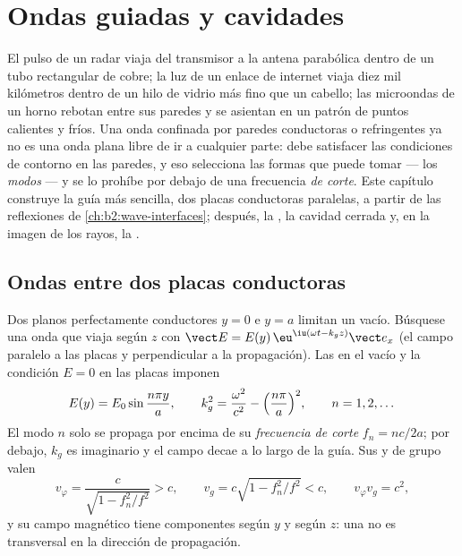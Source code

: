 \chapter{Ondas guiadas y cavidades}\label{ch:b2:guided-waves}

El pulso de un radar viaja del transmisor a la antena parabólica dentro de
un tubo rectangular de cobre; la luz de un enlace de internet viaja diez
mil kilómetros dentro de un hilo de vidrio más fino que un cabello; las
microondas de un horno rebotan entre sus paredes y se asientan en un
patrón de puntos calientes y fríos. Una onda confinada por paredes
conductoras o refringentes ya no es una onda plana libre de ir a cualquier
parte: debe satisfacer las condiciones de contorno en las paredes, y eso
selecciona las formas que puede tomar --- los \emph{modos} --- y se lo
prohíbe por debajo de una frecuencia \emph{de corte}. Este capítulo
construye la guía más sencilla, dos placas conductoras paralelas, a partir
de las reflexiones de \cref{ch:b2:wave-interfaces}; después, la , la cavidad cerrada y, en la imagen de los rayos, la .

\section{Ondas entre dos placas conductoras}

\begin{proposition}\label{prop:b2:guided-waves:plates}
Dos planos perfectamente conductores $y = 0$ e $y = a$ limitan un vacío.
Búsquese una onda que viaja según $z$ con $\vect E = E(y)\,\eu^{\iu(\omega t - k_gz)}
\vect e_x$ (el campo paralelo a las placas y perpendicular a la
propagación). Las  en el vacío y la condición $E = 0$
en las placas imponen
\[
E(y) = E_0\sin\frac{n\pi y}a , \qquad
k_g^2 = \frac{\omega^2}{c^2} - \Bigl(\frac{n\pi}a\Bigr)^2 , \qquad n = 1, 2, \dots
\]
El modo $n$ solo se propaga por encima de su \emph{frecuencia de corte} $f_n = nc/2a$;
por debajo, $k_g$ es imaginario y el campo decae a lo largo de la guía. Sus
 y de grupo valen
\[
v_\varphi = \frac c{\sqrt{1 - f_n^2/f^2}} > c , \qquad
v_g = c\sqrt{1 - f_n^2/f^2} < c , \qquad v_\varphi v_g = c^2 ,
\]
y su campo magnético tiene componentes según $y$ y según $z$: una
 no es transversal en la dirección de propagación.
\end{proposition}

